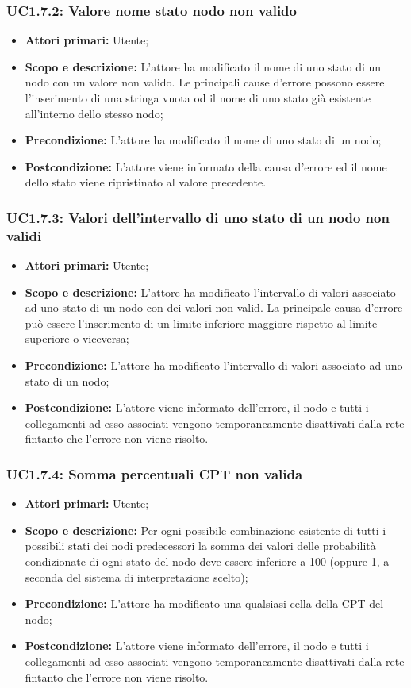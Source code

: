 \subsubsection{UC1.7.2: Valore nome stato nodo non valido} 
\begin{itemize} 
	\item{\textbf{Attori primari:} Utente;} 
	\item{\textbf{Scopo e descrizione:} L'attore ha modificato il nome di uno stato di un nodo con un valore non valido. Le principali cause d'errore possono essere l'inserimento di una stringa vuota od il nome di uno stato già esistente all'interno dello stesso nodo;} 
	\item{\textbf{Precondizione:} L'attore ha modificato il nome di uno stato di un nodo;} 
	\item{\textbf{Postcondizione:} L'attore viene informato della causa d'errore ed il nome dello stato viene ripristinato al valore precedente.} 
\end{itemize} 
\subsubsection{UC1.7.3: Valori dell'intervallo di uno stato di un nodo non validi} 
\begin{itemize} 
	\item{\textbf{Attori primari:} Utente;} 
	\item{\textbf{Scopo e descrizione:} L'attore ha modificato l'intervallo di valori associato ad uno stato di un nodo con dei valori non valid. La principale causa d'errore può essere l'inserimento di un limite inferiore maggiore rispetto al limite superiore o viceversa;} 
	\item{\textbf{Precondizione:} L'attore ha modificato l'intervallo di valori associato ad uno stato di un nodo;} 
	\item{\textbf{Postcondizione:} L'attore viene informato dell'errore, il nodo e tutti i collegamenti ad esso associati vengono temporaneamente disattivati dalla rete fintanto che l'errore non viene risolto.} 
\end{itemize} 
\subsubsection{UC1.7.4: Somma percentuali CPT non valida} 
\begin{itemize} 
	\item{\textbf{Attori primari:} Utente;} 
	\item{\textbf{Scopo e descrizione:} Per ogni possibile combinazione esistente di tutti i possibili stati dei nodi predecessori la somma dei valori delle probabilità condizionate di ogni stato del nodo deve essere inferiore a 100 (oppure 1, a seconda del sistema di interpretazione scelto);} 
	\item{\textbf{Precondizione:} L'attore ha modificato una qualsiasi cella della CPT del nodo;} 
	\item{\textbf{Postcondizione:} L'attore viene informato dell'errore, il nodo e tutti i collegamenti ad esso associati vengono temporaneamente disattivati dalla rete fintanto che l'errore non viene risolto.}
\end{itemize} 
